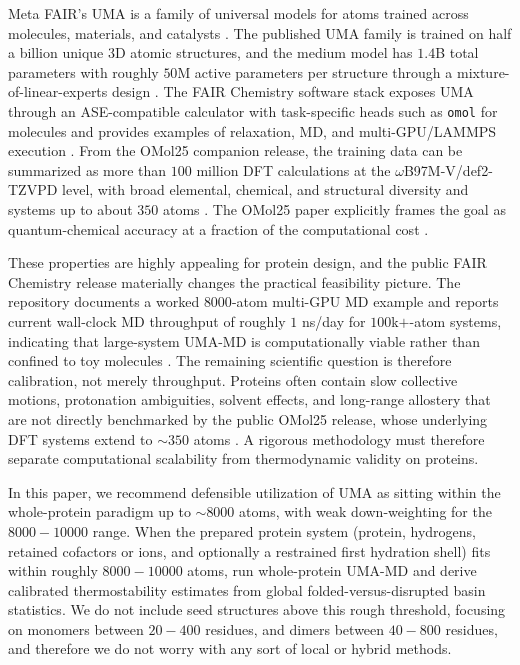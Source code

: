 \documentclass[11pt]{article}
\begin{document}
Meta FAIR's UMA is a family of universal models for atoms trained across molecules, materials, and catalysts \citep{wood2025uma}. The published UMA family is trained on half a billion unique 3D atomic structures, and the medium model has $1.4$B total parameters with roughly $50$M active parameters per structure through a mixture-of-linear-experts design \citep{wood2025uma}. The FAIR Chemistry software stack exposes UMA through an ASE-compatible calculator with task-specific heads such as \texttt{omol} for molecules and provides examples of relaxation, MD, and multi-GPU/LAMMPS execution \citep{fairchem2025github}. From the OMol25 companion release, the training data can be summarized as more than $100$ million DFT calculations at the $\omega$B97M-V/def2-TZVPD level, with broad elemental, chemical, and structural diversity and systems up to about $350$ atoms \citep{levine2025omol25}. The OMol25 paper explicitly frames the goal as quantum-chemical accuracy at a fraction of the computational cost \citep{levine2025omol25}.

These properties are highly appealing for protein design, and the public FAIR Chemistry release materially changes the practical feasibility picture. The repository documents a worked $8000$-atom multi-GPU MD example and reports current wall-clock MD throughput of roughly $1$ ns/day for $100$k$+$-atom systems, indicating that large-system UMA-MD is computationally viable rather than confined to toy molecules \citep{fairchem2025github}. The remaining scientific question is therefore calibration, not merely throughput. Proteins often contain slow collective motions, protonation ambiguities, solvent effects, and long-range allostery that are not directly benchmarked by the public OMol25 release, whose underlying DFT systems extend to $\sim 350$ atoms \citep{levine2025omol25}. A rigorous methodology must therefore separate computational scalability from thermodynamic validity on proteins.

In this paper, we recommend defensible utilization of UMA as sitting within the whole-protein paradigm up to $\sim 8000$ atoms, with weak down-weighting for the $8000-10000$ range. When the prepared protein system (protein, hydrogens, retained cofactors or ions, and optionally a restrained first hydration shell) fits within roughly $8000-10000$ atoms, run whole-protein UMA-MD and derive calibrated thermostability estimates from global folded-versus-disrupted basin statistics. We do not include seed structures above this rough threshold, focusing on monomers between $20-400$ residues, and dimers between $40-800$ residues, and therefore we do not worry with any sort of local or hybrid methods. 
\end{document}
